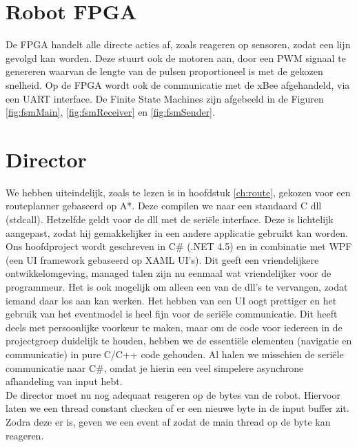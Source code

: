 \documentclass{report}
\begin{document}
\section{Robot FPGA}
De FPGA handelt alle directe acties af, zoals reageren op sensoren, zodat een lijn gevolgd kan worden.
Deze stuurt ook de motoren aan, door een PWM signaal te genereren waarvan de lengte van de pulsen proportioneel is met de gekozen snelheid.
Op de FPGA wordt ook de communicatie met de xBee afgehandeld, via een UART interface.
De Finite State Machines zijn afgebeeld in de Figuren \ref{fig:fsmMain}, \ref{fig:fsmReceiver} en \ref{fig:fsmSender}.

\section{Director}
We hebben uiteindelijk, zoals te lezen is in hoofdstuk \ref{ch:route}, gekozen voor een routeplanner gebaseerd op A*. Deze compilen we naar een standaard C dll (stdcall).
Hetzelfde geldt voor de dll met de seriële interface. Deze is lichtelijk aangepast, zodat hij gemakkelijker in een andere applicatie gebruikt kan worden.
Ons hoofdproject wordt geschreven in C\# (.NET 4.5) en in combinatie met WPF (een UI framework gebaseerd op XAML UI's).
Dit geeft een vriendelijkere ontwikkelomgeving, managed talen zijn nu eenmaal wat vriendelijker voor de programmeur.
Het is ook mogelijk om alleen een van de dll's te vervangen, zodat iemand daar los aan kan werken.
Het hebben van een UI oogt prettiger en het gebruik van het eventmodel is heel fijn voor de seriële communicatie.
Dit heeft deels met persoonlijke voorkeur te maken, maar om de code voor iedereen in de projectgroep duidelijk te houden, hebben we de essentiële elementen (navigatie en communicatie) in pure C/C++ code gehouden. Al halen we misschien de seriële communicatie naar C\#, omdat je hierin een veel simpelere asynchrone afhandeling van input hebt.\\
De director moet nu nog adequaat reageren op de bytes van de robot.
Hiervoor laten we een thread constant checken of er een nieuwe byte in de input buffer zit. Zodra deze er is, geven we een event af zodat de main thread op de byte kan reageren.
\end{document}
